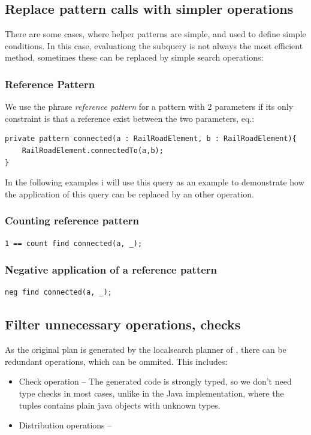 \subsection{Replace pattern calls with simpler operations}
There are some cases, where helper patterns are simple, and used to define simple conditions. 
In this case, evaluationg the subquery is not always the most efficient method, sometimes these can be replaced by simple search operations:

\subsubsection{Reference Pattern}
We use the phrase \emph{reference pattern} for a pattern with 2 parameters if its only constraint is that a reference exist between the two parameters, eq.:
\begin{lstlisting}[language = vql]
private pattern connected(a : RailRoadElement, b : RailRoadElement){
	RailRoadElement.connectedTo(a,b);
}
\end{lstlisting}
In the following examples i will use this query as an example to demonstrate how the application of this query can be replaced by an other operation.

\subsubsection{Counting reference pattern}
\begin{lstlisting}[language = vql]
1 == count find connected(a, _);
\end{lstlisting}


\subsubsection{Negative application of a reference pattern}

\begin{lstlisting}[language = vql]
neg find connected(a, _);
\end{lstlisting}

\subsection{Filter unnecessary operations, checks}
As the original plan is generated by the localsearch planner of \viatra{}, there can be redundant operations, which can be ommited. This includes:

\begin{itemize}
	\item Check operation -- The generated code is strongly typed, so we don't need type checks in most cases, unlike in the Java implementation, where the tuples contains plain java objects with unknown types.
	
	\item Distribution operations -- 
\end{itemize}



